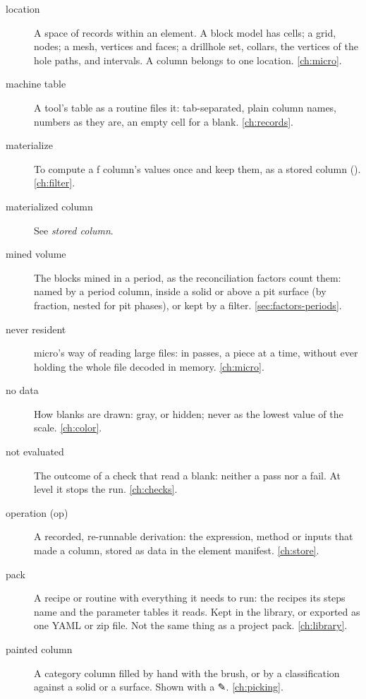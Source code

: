 \begin{description}
\item[location] A space of records within an element. A block model has cells; a grid, nodes; a
  mesh, vertices and faces; a drillhole set, collars, the vertices of the hole paths, and intervals. A column
  belongs to one location. \cref{ch:micro}.

\item[machine table] A tool's table as a routine files it: tab-separated, plain column names,
  numbers as they are, an empty cell for a blank. \cref{ch:records}.

\item[materialize] To compute a ƒ column's values once and keep them, as a stored column
  (). \cref{ch:filter}.

\item[materialized column] See \emph{stored column}.

\item[mined volume] The blocks mined in a period, as the reconciliation factors count them: named
  by a period column, inside a solid or above a pit surface (by fraction, nested for pit phases),
  or kept by a filter. \cref{sec:factors-periods}.

\item[never resident] micro's way of reading large files: in passes, a piece at a time, without
  ever holding the whole file decoded in memory. \cref{ch:micro}.

\item[no data] How blanks are drawn: gray, or hidden; never as the lowest value of the scale.
  \cref{ch:color}.

\item[not evaluated] The outcome of a check that read a blank: neither a pass nor a fail. At level
   it stops the run. \cref{ch:checks}.

\item[operation (op)] A recorded, re-runnable derivation: the expression, method or inputs that
  made a column, stored as data in the element manifest. \cref{ch:store}.

\item[pack] A recipe or routine with everything it needs to run: the recipes its steps name and the
  parameter tables it reads. Kept in the library, or exported as one YAML or zip file. Not the same
  thing as a project pack. \cref{ch:library}.

\item[painted column] A category column filled by hand with the brush, or by a classification
  against a solid or a surface. Shown with a ✎. \cref{ch:picking}.


\end{description}
